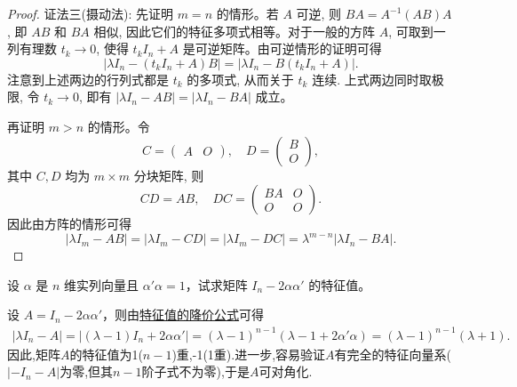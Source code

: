 \documentclass[../../main.tex]{subfiles}
\begin{document}
\begin{proof}
{\color{blue}证法三(摄动法):} 先证明 \(m = n\) 的情形。若 \(A\) 可逆, 则 \(BA = A^{-1}(AB)A\), 即 \(AB\) 和 \(BA\) 相似, 因此它们的特征多项式相等。对于一般的方阵 \(A\), 可取到一列有理数 \(t_k \to 0\), 使得 \(t_k I_n + A\) 是可逆矩阵。由可逆情形的证明可得
\[
|\lambda I_n - (t_k I_n + A)B| = |\lambda I_n - B(t_k I_n + A)|.
\]
注意到上述两边的行列式都是 \( t_k \) 的多项式, 从而关于 \( t_k \) 连续. 上式两边同时取极限, 令 \( t_k \to 0 \), 即有
\(
|\lambda I_n - AB| = |\lambda I_n - BA|
\)
成立。

再证明 \( m > n \) 的情形。令
\[
C = \begin{pmatrix}
A & O
\end{pmatrix}, \quad D = \begin{pmatrix}
B \\
O
\end{pmatrix},
\]
其中 \( C, D \) 均为 \( m \times m \) 分块矩阵, 则
\[
CD = AB, \quad DC = \begin{pmatrix}
BA & O \\
O & O
\end{pmatrix}.
\]
因此由方阵的情形可得
\[
|\lambda I_m - AB| = |\lambda I_m - CD| = |\lambda I_m - DC| = \lambda^{m-n} |\lambda I_n - BA|.
\]

\end{proof}

\begin{example}
设 $\alpha$ 是 $n$ 维实列向量且 $\alpha' \alpha = 1$，试求矩阵 $I_n - 2 \alpha \alpha'$ 的特征值。
\end{example}
\begin{solution}
设 $A = I_n - 2 \alpha \alpha'$，则由\hyperref[theorem:特征值的降价公式]{特征值的降价公式}可得
\begin{align*}
| \lambda I_n - A | 
= | (\lambda - 1) I_n + 2 \alpha \alpha' | 
= (\lambda - 1)^{n-1} (\lambda - 1 + 2 \alpha' \alpha) 
= (\lambda - 1)^{n-1} (\lambda + 1).
\end{align*}
因此,矩阵$A$的特征值为1($n-1$)重,-1(1重).进一步,容易验证$A$有完全的特征向量系($| -I_n - A | $为零,但其$n-1$阶子式不为零),于是$A$可对角化.

\end{solution}
\end{document}
